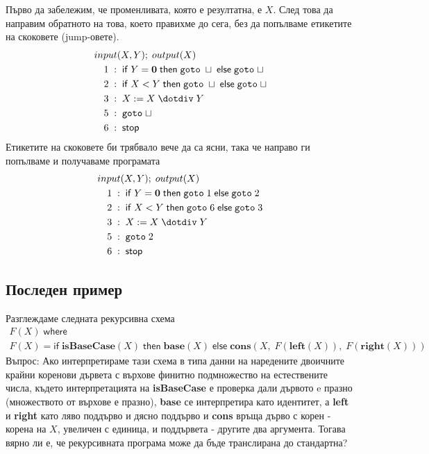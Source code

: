 \documentclass[14pt]{extarticle}
\begin{document}
\par Първо да забележим, че променливата, която е резултатна, е \(X\).
След това да направим обратното на това, което правихме до сега, без да попълваме етикетите на скоковете (jump-овете).
\begin{align*}
    & input(X, Y); \; output(X) \\
    & \quad 1 \; : \; \mathsf{if} \; Y \;\mathbf{=}\; \mathbf 0 \; \mathsf{then} \; \mathtt{goto} \; \sqcup  \; \mathsf{else} \; \mathtt{goto} \; \sqcup \\
    & \quad 2 \; : \; \mathsf{if} \; X \;\mathbf{<}\; Y \; \mathsf{then} \; \mathtt{goto} \; \sqcup  \; \mathsf{else} \; \mathtt{goto} \; \sqcup \\
    & \quad 3 \; : \; X := X \;\mathbf{\dotdiv}\;  Y \\
    & \quad 5 \; : \; \mathtt{goto} \; \sqcup \\
    & \quad 6 \; : \; \mathsf{stop}
\end{align*}
Етикетите на скоковете би трябвало вече да са ясни, така че направо ги попълваме и получаваме програмата
\begin{align*}
    & input(X, Y); \; output(X) \\
    & \quad 1 \; : \; \mathsf{if} \; Y \;\mathbf{=}\; \mathbf 0 \; \mathsf{then} \; \mathtt{goto} \; 1  \; \mathsf{else} \; \mathtt{goto} \; 2 \\
    & \quad 2 \; : \; \mathsf{if} \; X \;\mathbf{<}\; Y \; \mathsf{then} \; \mathtt{goto} \; 6  \; \mathsf{else} \; \mathtt{goto} \; 3 \\
    & \quad 3 \; : \; X := X \;\mathbf{\dotdiv}\; Y \\
    & \quad 5 \; : \; \mathtt{goto} \; 2 \\
    & \quad 6 \; : \; \mathsf{stop}
\end{align*}
\subsection*{Последен пример}
Разглеждаме следната рекурсивна схема
\begin{align*}
    F(X) \; \mathsf{where} \\
    F(X) = \mathsf{if} \; \mathbf{isBaseCase}(X) \; \mathsf{then} \; \mathbf{base}(X)  \; \mathsf{else} \; \mathbf{cons}(X,\; F(\mathbf{left}(X)),\;  F(\mathbf{right}(X)))
\end{align*}
Въпрос: Ако интерпретираме тази схема в типа данни на наредените двоичните крайни коренови дървета с върхове финитно подмножество на естествените числа, където интерпретацията на \textbf{isBaseCase} е проверка дали дървото e празно (множеството от върхове е празно), \textbf{base} се интерпретира като идентитет, а \textbf{left} и \textbf{right} като ляво поддърво и дясно поддърво и \textbf{cons} връща дърво с корен - корена на \(X\), увеличен с единица, и поддървета - другите два аргумента. Тогава вярно ли е, че рекурсивната програма може да бъде транслирана до стандартна? \\
\end{document}
